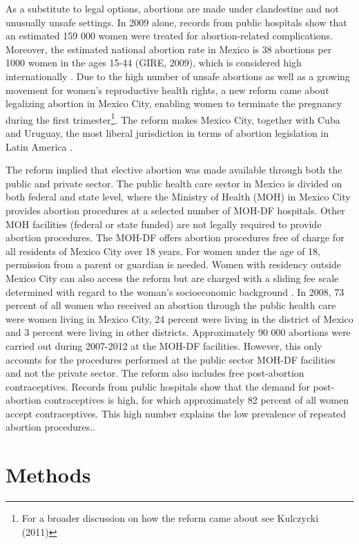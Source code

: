 \documentclass[a4paper, 11pt]{article}
\begin{document}
\begin{spacing}{1.5}
\begin{multicols}{2}
 As a substitute to legal options, abortions are made under clandestine and not unusually unsafe settings. In 2009 alone, records from public hospitals show that an estimated 159 000 women were treated for abortion-related complications. Moreover, the estimated national abortion rate in Mexico is 38 abortions per 1000 women in the ages 15-44 (GIRE, 2009), which is considered high internationally \cite{Becker}. Due to the high number of unsafe abortions as well as a growing movement for women's reproductive health rights, a new reform came about legalizing abortion in Mexico City, enabling women to terminate the pregnancy during the first trimester\footnote{For a broader discussion on how the reform came about see Kulczycki (2011)}. The reform makes Mexico City, together with Cuba and Uruguay, the most liberal jurisdiction in terms of abortion legislation in Latin America \citep{Fraser}. 
 
 The reform implied that elective abortion was made available through both the public and private sector. The public health care sector in Mexico is divided on both federal and state level, where the Ministry of Health (MOH) in Mexico City provides abortion procedures at a selected number of MOH-DF hospitals. Other MOH facilities (federal or state funded) are not legally required to provide abortion procedures. The MOH-DF offers abortion procedures free of charge for all residents of Mexico City over 18 years. For women under the age of 18, permission from a parent or guardian is needed. Women with residency outside Mexico City can also access the reform but are charged with a sliding fee scale determined with regard to the woman's socioeconomic background \citep{Kalb}. In 2008, 73 percent of all women who received an abortion through the public health care were women living in Mexico City, 24 percent were living in the district of Mexico and 3 percent were living in other districts. Approximately 90 000 abortions were carried out during 2007-2012 at the MOH-DF facilities. However, this only accounts for the procedures performed at the public sector MOH-DF facilities and not the private sector. The reform also includes free post-abortion contraceptives. Records from public hospitals show that the demand for post-abortion contraceptives is high, for which approximately 82 percent of all women accept contraceptives. This high number explains the low prevalence of repeated abortion procedures.\citep{Becker}. 
 

\section{Methods}

\end{multicols}
\end{spacing}
\end{document}
